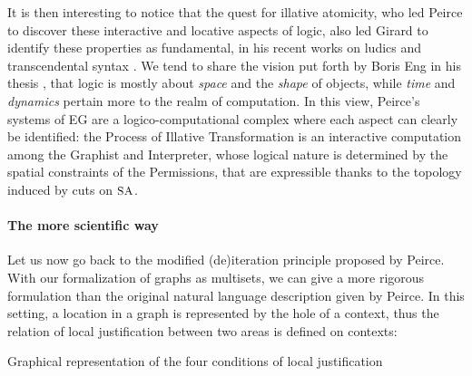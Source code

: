 It is then interesting to notice that the quest for illative atomicity, who led
Peirce to discover these interactive and locative aspects of logic, also led
Girard to identify these properties as fundamental, in his recent works on
ludics \cite{girard_locus_2001} and transcendental syntax
\cite{eng_exegesis_2023}. We tend to share the vision put forth by Boris Eng in
his thesis \cite[\S 24.4]{eng_exegesis_2023}, that logic is mostly about
\emph{space} and the \emph{shape} of objects, while \emph{time} and
\emph{dynamics} pertain more to the realm of computation. In this view, Peirce's
systems of EG are a logico-computational complex where each aspect can clearly
be identified: the Process of Illative Transformation is an interactive
computation among the Graphist and Interpreter, whose logical nature is
determined by the spatial constraints of the Permissions, that are expressible
thanks to the topology induced by cuts on $\small\textsc{SA}$.

\paragraph{The more scientific way}

Let us now go back to the modified (de)iteration principle proposed by Peirce.
With our formalization of graphs as multisets, we can give a more rigorous
formulation than the original natural language description given by
Peirce. In this setting, a location in a graph is represented by the
hole of a context, thus the relation of local justification between two areas is
defined on contexts:

\begin{marginfigure}
  
  \caption{Graphical representation of the four conditions of local
  justification}
\end{marginfigure}

